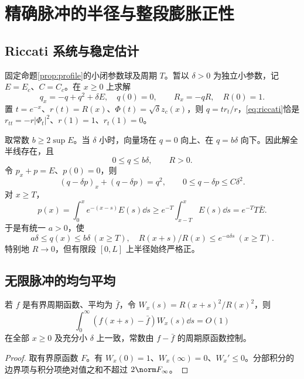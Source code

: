 \section{精确脉冲的半径与整段膨胀正性}\label{sec:positive}
\subsection{Riccati 系统与稳定估计}
固定命题\ref{prop:profile}的小闭参数球及周期 $T$。暂以 $\delta>0$ 为独立小参数，记 $E=E_c$、$C=C_c$。在 $x\ge0$ 上求解
\begin{equation}\label{eq:riccati}
q_x=-q+q^2+\delta E,\quad q(0)=0,
\qquad R_x=-qR,\quad R(0)=1.
\end{equation}
置 $t=e^{-x}$、$r(t)=R(x)$、$\Phi(t)=\sqrt\delta z_c(x)$，则 $q=tr_t/r$，\eqref{eq:riccati}恰是 $r_{tt}=-r|\Phi_t|^2$、$r(1)=1$、$r_t(1)=0$。

取常数 $b\ge2\sup E$。当 $\delta$ 小时，向量场在 $q=0$ 向上、在 $q=b\delta$ 向下。因此解全半线存在，且
\begin{equation}\label{eq:qbounds}
0\le q\le b\delta,\qquad R>0.
\end{equation}
令 $p_x+p=E$、$p(0)=0$，则
\begin{equation}\label{eq:q-p}
(q-\delta p)_x+(q-\delta p)=q^2,
\qquad 0\le q-\delta p\le C\delta^2.
\end{equation}
对 $x\ge T$，
\[
p(x)=\int_0^xe^{-(x-s)}E(s)\dd s
\ge e^{-T}\int_{x-T}^xE(s)\dd s=e^{-T}T\bar E.
\]
于是有统一 $a>0$，使
\begin{equation}\label{eq:qpositive}
a\delta\le q(x)\le b\delta\ (x\ge T),\quad
R(x+s)/R(x)\le e^{-a\delta s}\ (x\ge T).
\end{equation}
特别地 $R\to0$，但有限段 $[0,L]$ 上半径始终严格正。

\subsection{无限脉冲的均匀平均}
\begin{lemma}[单调权重周期平均]\label{lem:average}
若 $f$ 是有界周期函数、平均为 $\bar f$，令
$W_x(s)=R(x+s)^2/R(x)^2$，则
\begin{equation}\label{eq:average}
\int_0^\infty(f(x+s)-\bar f)W_x(s)\dd s=O(1)
\end{equation}
在全部 $x\ge0$ 及充分小 $\delta$ 上一致，常数由 $f-\bar f$ 的周期原函数控制。
\end{lemma}
\begin{proof}
取有界原函数 $F$。有 $W_x(0)=1$、$W_x(\infty)=0$、$W_x'\le0$。分部积分的边界项与积分项绝对值之和不超过 $2\norm F_\infty$。
\end{proof}

